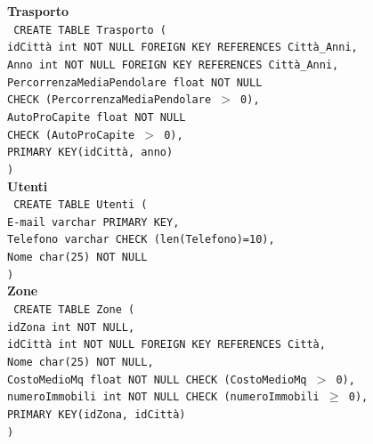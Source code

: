 \documentclass[a4paper,12pt]{report}
\begin{document}
                \noindent
                {\large \textbf{Trasporto}} \\
                \texttt{
                    CREATE TABLE Trasporto ( \\
                    \null\quad\quad idCittà                     int     NOT NULL FOREIGN KEY REFERENCES Città\_Anni, \\
                    \null\quad\quad Anno                        int     NOT NULL FOREIGN KEY REFERENCES Città\_Anni, \\
                    \null\quad\quad PercorrenzaMediaPendolare   float   NOT NULL \\
                            \null\qquad\qquad CHECK (PercorrenzaMediaPendolare $>$ 0), \\
                    \null\quad\quad AutoProCapite               float   NOT NULL \\
                            \null\qquad\qquad CHECK (AutoProCapite $>$ 0), \\
                    \null\quad\quad PRIMARY KEY(idCittà, anno) \\
                    )
                } \\

                \noindent
                {\large \textbf{Utenti}} \\
                \texttt{
                    CREATE TABLE Utenti ( \\
                    \null\quad\quad E-mail      varchar     PRIMARY KEY, \\
                    \null\quad\quad Telefono    varchar     CHECK (len(Telefono)=10), \\
                    \null\quad\quad Nome        char(25)    NOT NULL \\
                    )
                } \\

                \noindent
                {\large \textbf{Zone}} \\
                \texttt{
                    CREATE TABLE Zone ( \\
                    \null\quad\quad idZona          int         NOT NULL, \\
                    \null\quad\quad idCittà         int         NOT NULL FOREIGN KEY REFERENCES Città, \\
                    \null\quad\quad Nome            char(25)    NOT NULL, \\
                    \null\quad\quad CostoMedioMq    float       NOT NULL CHECK (CostoMedioMq $>$ 0), \\
                    \null\quad\quad numeroImmobili  int         NOT NULL CHECK (numeroImmobili $\geq$ 0), \\
                    \null\quad\quad PRIMARY KEY(idZona, idCittà) \\
                    )
                } \\
\end{document}
